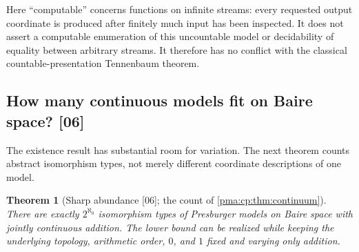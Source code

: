 \documentclass[11pt]{article}
\numberwithin{equation}{section}
\newtheorem{theorem}{Theorem}[section]
\theoremstyle{definition}
\theoremstyle{remark}
\newcommand{\src}[1]{\textup{\textsf{\small[#1]}}}
\begin{document}
Here ``computable'' concerns functions on infinite streams: every
requested output coordinate is produced after finitely much input has
been inspected. It does not assert a computable enumeration of this
uncountable model or decidability of equality between arbitrary streams.
It therefore has no conflict with the classical countable-presentation
Tennenbaum theorem.

\subsection{How many continuous models fit on Baire space? \src{06}}
\label{pma:cp:sec:abundance}

The existence result has substantial room for variation. The next theorem
counts abstract isomorphism types, not merely different coordinate
descriptions of one model.

\begin{theorem}[Sharp abundance \src{06}; the count of \cref{pma:cp:thm:continuum}]
\label{pma:cp:s06:thm:continuum}
There are exactly $2^{\aleph_0}$ isomorphism types of Presburger models
on Baire space with jointly continuous addition. The lower bound can be
realized while keeping the underlying topology, arithmetic order, $0$,
and $1$ fixed and varying only addition.
\end{theorem}
\end{document}
